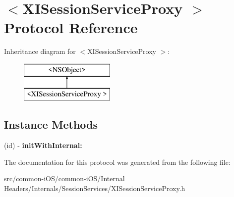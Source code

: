 \hypertarget{protocol_x_i_session_service_proxy_01-p}{}\section{$<$X\+I\+Session\+Service\+Proxy $>$ Protocol Reference}
\label{protocol_x_i_session_service_proxy_01-p}
Inheritance diagram for $<$X\+I\+Session\+Service\+Proxy $>$\+:\begin{figure}[H]
\begin{center}
\leavevmode
\includegraphics[height=2.000000cm]{protocol_x_i_session_service_proxy_01-p}
\end{center}
\end{figure}
\subsection*{Instance Methods}
\begin{DoxyCompactItemize}
\item 
\hypertarget{protocol_x_i_session_service_proxy_01-p_a2b7c862f64b6d49ec45164c79fe0e7b9}{}\label{protocol_x_i_session_service_proxy_01-p_a2b7c862f64b6d49ec45164c79fe0e7b9} 
(id) -\/ {\bfseries init\+With\+Internal\+:}
\end{DoxyCompactItemize}


The documentation for this protocol was generated from the following file\+:\begin{DoxyCompactItemize}
\item 
src/common-\/i\+O\+S/common-\/i\+O\+S/\+Internal Headers/\+Internals/\+Session\+Services/X\+I\+Session\+Service\+Proxy.\+h\end{DoxyCompactItemize}
